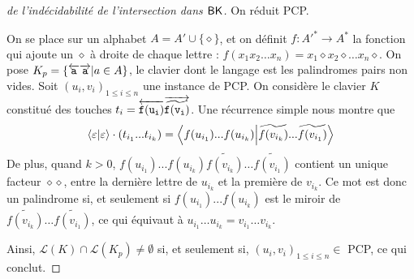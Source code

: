 \documentclass[12pt, a4paper]{article}
\renewcommand{\L}{\mathcal{L}}
\begin{document}
    \begin{proof}[de l'indécidabilité de l'intersection dans $\mathsf{BK}$] 
        
        On réduit PCP.

        On se place sur un alphabet $A = A' \cup \{\diamond\}$, et on définit $f : A'^* \to A^*$ la fonction qui ajoute un $\diamond$ à droite de chaque lettre : $f(x_1x_2\dots x_n) = x_1\diamond x_2 \diamond \dots x_n \diamond$.
        On pose $K_p = \{\overleftarrow{\mathtt{a}}\overrightarrow{\mathtt{a}} | a \in A\}$, le clavier dont le langage est les palindromes pairs non vides.
        Soit $(u_i,v_i)_{1\leqslant i \leqslant n}$ une instance de PCP. On considère le clavier $K$ constitué des touches $t_i = \overleftarrow{\mathtt{f(u_i)}}\overrightarrow{\mathtt{\widetilde{f(v_i)}}}$.
        Une récurrence simple nous montre que 
        \[\left\langle \varepsilon \middle| \varepsilon \right\rangle\cdot(t_{i_1}...t_{i_k}) = \left\langle f(u_{i_1})...f(u_{i_k}) \middle| \widetilde{f(v_{i_k})}...\widetilde{f(v_{i_1})} \right\rangle\]
        De plus, quand $k>0$, $f(u_{i_1})...f(u_{i_k})\widetilde{f(v_{i_k})}\dots\widetilde{f(v_{i_1})}$ contient un unique facteur $\diamond\diamond$, 
        entre la dernière lettre de $u_{i_k}$ et la première de $v_{i_k}$. Ce mot est donc un palindrome si, et seulement si
        $f(u_{i_1})...f(u_{i_k})$ est le miroir de $\widetilde{f(v_{i_k})}\dots\widetilde{f(v_{i_1})}$, ce qui équivaut à $u_{i_1}\dots u_{i_k} = v_{i_1} \dots v_{i_k}$.

        Ainsi, $\L(K) \cap \L(K_p) \neq \emptyset$ si, et seulement si, $(u_i,v_i)_{1\leqslant i \leqslant n} \in$ PCP, ce qui conclut.        
    \end{proof}
    \clearpage
    \printbibliography
\end{document}
